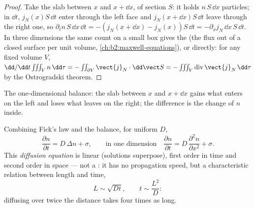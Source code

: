 \begin{proof}
Take the slab between $x$ and $x + \dd x$, of section $S$: it holds
$n\,S\,\dd x$ particles; in $\dd t$, $j_N(x)S\,\dd t$ enter through the
left face and $j_N(x + \dd x)S\,\dd t$ leave through the right one, so
$\partial_t n\,S\,\dd x\,\dd t = -(j_N(x+\dd x) - j_N(x))S\,\dd t =
-\partial_x j_N\,\dd x\,S\,\dd t$. In three dimensions the same count on
a small box gives the  (the flux out of a closed surface per
unit volume, \cref{ch:b2:maxwell-equations}), or directly: for any fixed
volume $V$, $\dd/\dd t \iiint_V n\,\dd\tau = -\iint_{\partial V}
\vect{j}_N\cdot\dd\vect S = -\iiint_V \operatorname{div}\vect{j}_N\,\dd\tau$
by the Ostrogradski theorem.
\end{proof}

\begin{omfigure}

{\small The one-dimensional balance: the slab between $x$ and $x + \dd
x$ gains what enters on the left and loses what leaves on the right;
the difference is the change of $n$ inside.}
\end{omfigure}

\begin{theorem}\label{thm:b2:particle-diffusion:equation}
Combining Fick's law and the balance, for uniform $D$,
\[
\frac{\partial n}{\partial t} = D\,\Delta n + \sigma ,
\qquad\text{in one dimension}\quad
\frac{\partial n}{\partial t} = D\,\frac{\partial^2 n}{\partial x^2} + \sigma .
\]
This \emph{diffusion equation} is linear
(solutions superpose), first order in time and second order in space
--- not a : it has no propagation speed, but a
characteristic relation between length and time,
\[
L \sim \sqrt{D t}, \qquad t \sim \frac{L^2}{D} :
\]
diffusing over twice the distance takes four times as long.
\end{theorem}

